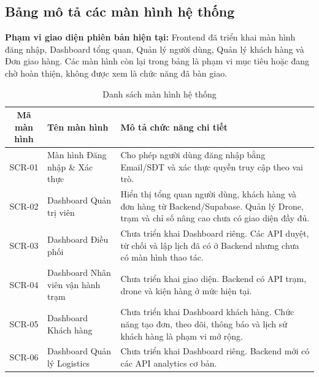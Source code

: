 \subsection{Bảng mô tả các màn hình hệ thống}

\textbf{Phạm vi giao diện phiên bản hiện tại:} Frontend đã triển khai màn hình đăng nhập, Dashboard tổng quan, Quản lý người dùng, Quản lý khách hàng và Đơn giao hàng. Các màn hình còn lại trong bảng là phạm vi mục tiêu hoặc đang chờ hoàn thiện, không được xem là chức năng đã bàn giao.

\begin{table}[H]
    \centering
    \caption{Danh sách màn hình hệ thống}
    \label{tab:screen-list}

    \renewcommand{\arraystretch}{1.4}

    \begin{tabular}{|c|p{4.2cm}|p{9cm}|}
        \hline

        \textbf{Mã màn hình} &
        \textbf{Tên màn hình} &
        \textbf{Mô tả chức năng chi tiết} \\
        \hline

        SCR-01 &
        Màn hình Đăng nhập \& Xác thực &
        Cho phép người dùng đăng nhập bằng Email/SĐT và xác thực quyền truy cập theo vai trò. \\
        \hline

        SCR-02 &
        Dashboard Quản trị viên &
        Hiển thị tổng quan người dùng, khách hàng và đơn hàng từ Backend/Supabase. Quản lý Drone, trạm và chỉ số nâng cao chưa có giao diện đầy đủ. \\
        \hline

        SCR-03 &
        Dashboard Điều phối &
        Chưa triển khai Dashboard riêng. Các API duyệt, từ chối và lập lịch đã có ở Backend nhưng chưa có màn hình thao tác. \\
        \hline

        SCR-04 &
        Dashboard Nhân viên vận hành trạm &
        Chưa triển khai giao diện. Backend có API trạm, drone và kiện hàng ở mức hiện tại. \\
        \hline

        SCR-05 &
        Dashboard Khách hàng &
        Chưa triển khai Dashboard khách hàng. Chức năng tạo đơn, theo dõi, thông báo và lịch sử khách hàng là phạm vi mở rộng. \\
        \hline

        SCR-06 &
        Dashboard Quản lý Logistics &
        Chưa triển khai Dashboard riêng. Backend mới có các API analytics cơ bản. \\
        \hline


\end{tabular}
\end{table}
